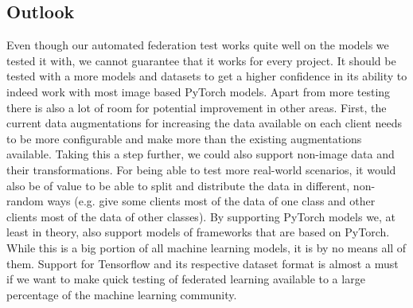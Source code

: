 \subsection{Outlook}
Even though our automated federation test works quite well on the models we tested it with, we cannot guarantee that it works for every project. It should be tested with a more models and datasets to get a higher confidence in its ability to indeed work with most image based PyTorch models. 
Apart from more testing there is also a lot of room for potential improvement in other areas. First, the current data augmentations for increasing the data available on each client needs to be more configurable and make more than the existing augmentations available. Taking this a step further, we could also support non-image data and their transformations. For being able to test more real-world scenarios, it would also be of value to be able to split and distribute the data in different, non-random ways (e.g. give some clients most of the data of one class and other clients most of the data of other classes).
By supporting PyTorch models we, at least in theory, also support models of frameworks that are based on PyTorch. While this is a big portion of all machine learning models, it is by no means all of them. Support for Tensorflow and its respective dataset format is almost a must if we want to make quick testing of federated learning available to a large percentage of the machine learning community.
